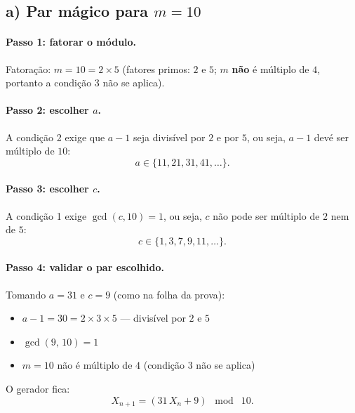 \documentclass[12pt,a4paper]{article}
\theoremstyle{definition}
\newcommand{\resultado}[1]{%
  \begin{center}
    \fbox{\parbox{0.85\linewidth}{\centering $\displaystyle #1$}}
  \end{center}
}
\begin{document}
\subsection{a) Par m\'agico para \texorpdfstring{$m = 10$}{m = 10}}

\paragraph{Passo 1: fatorar o m\'odulo.}

Fatoração: $m = 10 = 2 \times 5$ (fatores primos: $2$ e $5$; $m$ \textbf{n\~ao} \'e m\'ultiplo de $4$,
portanto a condição 3 n\~ao se aplica).

\paragraph{Passo 2: escolher $a$.}
A condição 2 exige que $a - 1$ seja divis\'ivel por $2$ e por $5$,
ou seja, $a - 1$ dev\'e ser m\'ultiplo de $10$:
\begin{equation}
  a \in \{11, 21, 31, 41, \ldots\}.
\end{equation}

\paragraph{Passo 3: escolher $c$.}
A condição 1 exige $\gcd(c, 10) = 1$, ou seja, $c$ n\~ao pode ser m\'ultiplo de $2$ nem de $5$:
\begin{equation}
  c \in \{1, 3, 7, 9, 11, \ldots\}.
\end{equation}

\paragraph{Passo 4: validar o par escolhido.}
Tomando $a = 31$ e $c = 9$ (como na folha da prova):
\begin{itemize}
  \item $a - 1 = 30 = 2 \times 3 \times 5$ --- divis\'ivel por $2$ e $5$ \checkmark
  \item $\gcd(9,\,10) = 1$ \checkmark
  \item $m = 10$ n\~ao \'e m\'ultiplo de $4$ (condição 3 n\~ao se aplica) \checkmark
\end{itemize}
\resultado{(a,c) = (31,\;9)}

O gerador fica:
\begin{equation}
  X_{n+1} = (31\,X_n + 9)\;\bmod\;10.
\end{equation}
\end{document}
